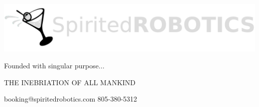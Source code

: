 \documentclass[11pt,a4paper]{memoir}
\begin{document}
\hspace{-1\parindent}\hspace{0.2mm} 
\includegraphics[width=0.8\linewidth]{spirited_robotics_logo.png}
\hspace{-1\parindent}\hspace{-0.207\linewidth} 

\vspace{2em}

Founded with singular purpose...

\hspace{0.05\linewidth}THE INEBRIATION OF ALL MANKIND



\vspace{4em}

\hspace{-1\parindent}\hspace{0.5mm} {\tiny  booking@spiritedrobotics.com } 
\hspace{0.34\linewidth} {\tiny 805-380-5312}
\end{document}
